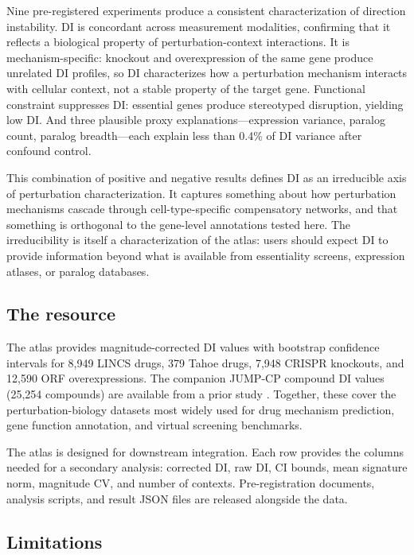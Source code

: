 \documentclass[11pt]{article}
\begin{document}
Nine pre-registered experiments produce a consistent characterization of
direction instability.  DI is concordant across measurement modalities,
confirming that it reflects a biological property of perturbation-context
interactions.  It is mechanism-specific: knockout and overexpression
of the same gene produce unrelated DI profiles, so DI characterizes how
a perturbation mechanism interacts with cellular context, not a stable
property of the target gene.  Functional constraint suppresses DI:
essential genes produce stereotyped disruption, yielding low DI.  And
three plausible proxy explanations---expression variance, paralog count,
paralog breadth---each explain less than 0.4\% of DI variance after
confound control.

This combination of positive and negative results defines DI as an
irreducible axis of perturbation characterization.  It captures
something about how perturbation mechanisms cascade through
cell-type-specific compensatory networks, and that something is
orthogonal to the gene-level annotations tested here.  The irreducibility
is itself a characterization of the atlas: users should expect DI to
provide information beyond what is available from essentiality screens,
expression atlases, or paralog databases.

\subsection{The resource}

The atlas provides magnitude-corrected DI values with bootstrap
confidence intervals for 8{,}949 LINCS drugs, 379 Tahoe drugs, 7{,}948
CRISPR knockouts, and 12{,}590 ORF overexpressions.  The companion JUMP-CP
compound DI values (25{,}254 compounds) are available from a prior
study \citep{tower2026confound}.  Together, these cover the
perturbation-biology datasets most widely used for drug mechanism
prediction, gene function annotation, and virtual screening
benchmarks.

The atlas is designed for downstream integration.  Each row provides the
columns needed for a secondary analysis: corrected DI, raw DI, CI
bounds, mean signature norm, magnitude CV, and number of contexts.
Pre-registration documents, analysis scripts, and result JSON files are
released alongside the data.

\subsection{Limitations}
\end{document}
